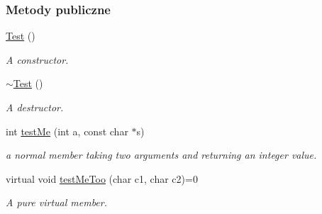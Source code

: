 \subsubsection*{Metody publiczne}
\begin{DoxyCompactItemize}
\item 
\hyperlink{classTest_a99f2bbfac6c95612322b0f10e607ebe5}{Test} ()
\begin{DoxyCompactList}\small\item\em A constructor. \end{DoxyCompactList}\item 
\hyperlink{classTest_a2b0a62f1e667bbe8d8cb18d785bfa991}{$\sim$\-Test} ()
\begin{DoxyCompactList}\small\item\em A destructor. \end{DoxyCompactList}\item 
int \hyperlink{classTest_af7115d71dda64654a7104c24f130e8d0}{test\-Me} (int a, const char $\ast$s)
\begin{DoxyCompactList}\small\item\em a normal member taking two arguments and returning an integer value. \end{DoxyCompactList}\item 
virtual void \hyperlink{classTest_a3edb9fdc1e9f0d5274b57386ab03704c}{test\-Me\-Too} (char c1, char c2)=0
\begin{DoxyCompactList}\small\item\em A pure virtual member. \end{DoxyCompactList}\end{DoxyCompactItemize}
